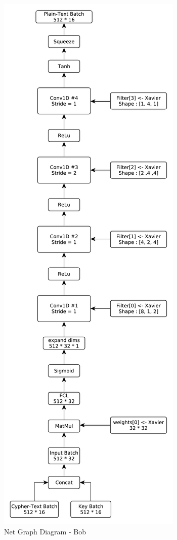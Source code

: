 \documentclass[12pt]{article}
\begin{document}
\newpage
\begin{figure}[!htbp]
	\begin{center}
		\includegraphics[height=0.93\textheight]{Bob-Diagram}
		\begin{center}
			\caption{ Net Graph Diagram - Bob}
		\end{center}
	\end{center}
\end{figure}
\end{document}
